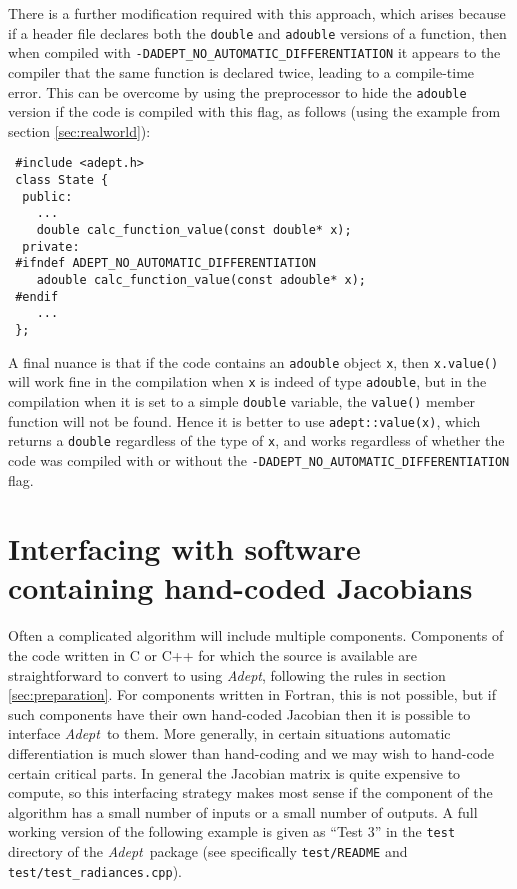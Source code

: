 \documentclass[a4,oneside]{book}
\def\codesize{\small}
\def\Adept{\emph{Adept}}
\def\code#1{{\codesize\texttt{#1}}}
\begin{document}
There is a further modification required with this approach, which
arises because if a header file declares both the \code{double} and
\code{adouble} versions of a function, then when compiled with
\code{-DADEPT\_NO\_AUTOMATIC\_DIFFERENTIATION} it appears to the
compiler that the same function is declared twice, leading to a
compile-time error.  This can be overcome by using the preprocessor to
hide the \code{adouble} version if the code is compiled with this
flag, as follows (using the example from section \ref{sec:realworld}):
%
\begin{lstlisting}
 #include <adept.h>
 class State {
  public:
    ...
    double calc_function_value(const double* x);
  private:
 #ifndef ADEPT_NO_AUTOMATIC_DIFFERENTIATION
    adouble calc_function_value(const adouble* x);
 #endif
    ...
 };
\end{lstlisting}

A final nuance is that if the code contains an \code{adouble} object
\code{x}, then \code{x.value()} will work fine in the compilation when
\code{x} is indeed of type \code{adouble}, but in the compilation when
it is set to a simple \code{double} variable, the \code{value()}
member function will not be found.  Hence it is better to use
\code{adept::value(x)}, which returns a \code{double} regardless of
the type of \code{x}, and works regardless of whether the code was
compiled with or without the
\code{-DADEPT\_NO\_AUTOMATIC\_DIFFERENTIATION} flag.

\section{Interfacing with software containing hand-coded Jacobians}
\label{sec:interfacehandcoded}
Often a complicated algorithm will include multiple components.
Components of the code written in C or C++ for which the source is
available are straightforward to convert to using \Adept, following
the rules in section \ref{sec:preparation}.  For components written in
Fortran, this is not possible, but if such components have their own
hand-coded Jacobian then it is possible to interface \Adept\ to them.
More generally, in certain situations automatic differentiation is
much slower than hand-coding \cite[see the Lax-Wendroff example
  in][]{Hogan2014} and we may wish to hand-code certain critical
parts.  In general the Jacobian matrix is quite expensive to compute,
so this interfacing strategy makes most sense if the component of the
algorithm has a small number of inputs or a small number of outputs. A
full working version of the following example is given as ``Test 3''
in the \code{test} directory of the \Adept\ package (see specifically
\code{test/README} and \code{test/test\_radiances.cpp}).
\end{document}

